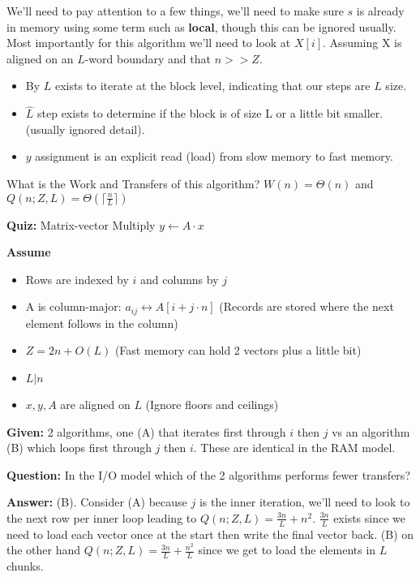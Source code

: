 \documentclass[../main.tex]{subfiles}
\begin{document}
	We'll need to pay attention to a few things, we'll need to make sure $s$ is already in memory using some term such as \textbf{local}, though this can be ignored usually. Most importantly for this algorithm we'll need to look at $X[i]$. Assuming X is aligned on an $L$-word boundary and that $n >> Z$.
	\begin{itemize}
		\item By $L$ exists to iterate at the block level, indicating that our steps are $L$ size.
		\item $\hat{L}$ step exists to determine if the block is of size L or a little bit smaller. (usually ignored detail).
		\item $y$ assignment is an explicit read (load) from slow memory to fast memory.
	\end{itemize}
	What is the Work and Transfers of this algorithm? $W(n) = \Theta(n)$ and $Q(n;Z,L)  = \Theta(\lceil\frac{n}{L}\rceil)$
	\begin{mdframed}[style=Quiz]
		\textbf{Quiz: } Matrix-vector Multiply $y \gets A \cdot x$
		
		\noindent
		\textbf{Assume}
		\begin{itemize}
			\item Rows are indexed by $i$ and columns by $j$
			\item A is column-major: $a_{ij} \leftrightarrow A[i + j \cdot n]$ (Records are stored where the next element follows in the column)
			\item $Z = 2n + O(L)$ (Fast memory can hold 2 vectors plus a little bit)
			\item $L | n$
			\item $x,y,A$ are aligned on $L$ (Ignore floors and ceilings)
		\end{itemize}
		
		\noindent
		\textbf{Given:} 2 algorithms, one (A) that iterates first through $i$ then $j$ vs an algorithm (B) which loops first through $j$ then $i$. These are identical in the RAM model.
		
		\noindent
		\textbf{Question:} In the I/O model which of the 2 algorithms performs fewer transfers?
		
		\noindent
		\textbf{Answer:} (B). Consider (A) because $j$ is the inner iteration, we'll need to look to the next row per inner loop leading to $Q(n;Z,L)  = \frac{3n}{L} + n^2$. $\frac{3n}{L}$ exists since we need to load each vector once at the start then write the final vector back. (B) on the other hand $Q(n;Z,L)  = \frac{3n}{L} + \frac{n^2}{L}$ since we get to load the elements in $L$ chunks.
	\end{mdframed}
\end{document}
